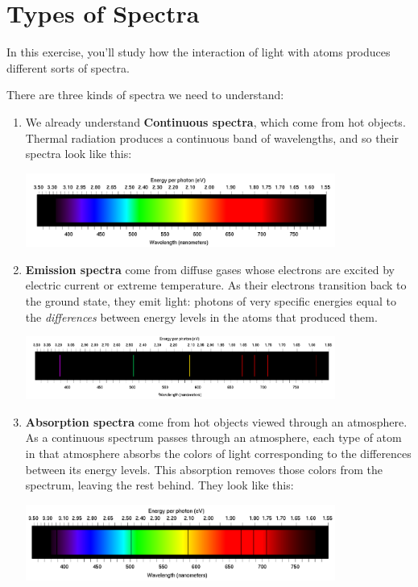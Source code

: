 \documentclass[12pt]{article}
\newcommand{\BC}{\begin{center}}
\newcommand{\EC}{\end{center}}
\begin{document}
\Large
\centerline{}

\normalsize

\section{Types of Spectra}

In this exercise, you'll study how the interaction of light with atoms produces different sorts of spectra.

There are three kinds of spectra we need to understand:

\begin{enumerate}
	\item We already understand {\bf Continuous spectra}, which come from hot objects. Thermal radiation produces a continuous band of wavelengths, and so their spectra look like this:
	\BC
	\includegraphics[width=4in]{spectrum-continuous.png}
	\EC
	
	
	
	
	\item {\bf Emission spectra} come from diffuse gases whose electrons are excited by electric current or extreme temperature. As their electrons transition back to the ground state, they emit light: photons of very specific energies equal to the {\it differences} between energy levels in the atoms that produced them.   
	
	\BC
		\includegraphics[width=4in]{spectrum-discrete.png}
	\EC
	\item {\bf Absorption spectra} come from hot objects viewed through an atmosphere. As a continuous spectrum passes through an atmosphere, each type of atom in that atmosphere absorbs the colors of light corresponding to the differences between its energy levels. This absorption removes those colors from the spectrum, leaving the rest behind. They look like this:
	\BC
	\includegraphics[width=4in]{spectrum-absorption.png}
	\EC
	
\end{enumerate}
\end{document}
